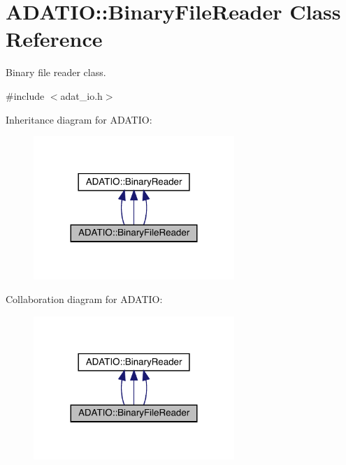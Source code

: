 \hypertarget{classADATIO_1_1BinaryFileReader}{}\section{A\+D\+A\+T\+IO\+:\+:Binary\+File\+Reader Class Reference}
\label{classADATIO_1_1BinaryFileReader}


Binary file reader class.  




{\ttfamily \#include $<$adat\+\_\+io.\+h$>$}



Inheritance diagram for A\+D\+A\+T\+IO\+:
\nopagebreak
\begin{figure}[H]
\begin{center}
\leavevmode
\includegraphics[width=215pt]{d7/d01/classADATIO_1_1BinaryFileReader__inherit__graph}
\end{center}
\end{figure}


Collaboration diagram for A\+D\+A\+T\+IO\+:
\nopagebreak
\begin{figure}[H]
\begin{center}
\leavevmode
\includegraphics[width=215pt]{d8/dc1/classADATIO_1_1BinaryFileReader__coll__graph}
\end{center}
\end{figure}
